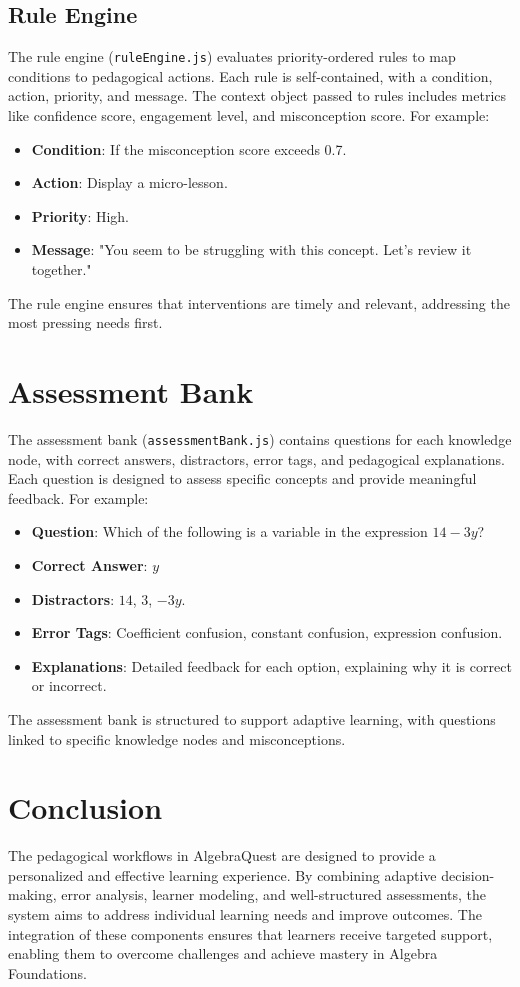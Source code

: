 \documentclass{article}
\begin{document}
\subsection{Rule Engine}
The rule engine (\texttt{ruleEngine.js}) evaluates priority-ordered rules to map conditions to pedagogical actions. Each rule is self-contained, with a condition, action, priority, and message. The context object passed to rules includes metrics like confidence score, engagement level, and misconception score. For example:
\begin{itemize}
    \item \textbf{Condition}: If the misconception score exceeds 0.7.
    \item \textbf{Action}: Display a micro-lesson.
    \item \textbf{Priority}: High.
    \item \textbf{Message}: "You seem to be struggling with this concept. Let's review it together."
\end{itemize}
The rule engine ensures that interventions are timely and relevant, addressing the most pressing needs first.

\section{Assessment Bank}
The assessment bank (\texttt{assessmentBank.js}) contains questions for each knowledge node, with correct answers, distractors, error tags, and pedagogical explanations. Each question is designed to assess specific concepts and provide meaningful feedback. For example:
\begin{itemize}
    \item \textbf{Question}: Which of the following is a variable in the expression $14 - 3y$?
    \item \textbf{Correct Answer}: $y$
    \item \textbf{Distractors}: $14$, $3$, $-3y$.
    \item \textbf{Error Tags}: Coefficient confusion, constant confusion, expression confusion.
    \item \textbf{Explanations}: Detailed feedback for each option, explaining why it is correct or incorrect.
\end{itemize}
The assessment bank is structured to support adaptive learning, with questions linked to specific knowledge nodes and misconceptions.

\section{Conclusion}
The pedagogical workflows in AlgebraQuest are designed to provide a personalized and effective learning experience. By combining adaptive decision-making, error analysis, learner modeling, and well-structured assessments, the system aims to address individual learning needs and improve outcomes. The integration of these components ensures that learners receive targeted support, enabling them to overcome challenges and achieve mastery in Algebra Foundations.
\end{document}
